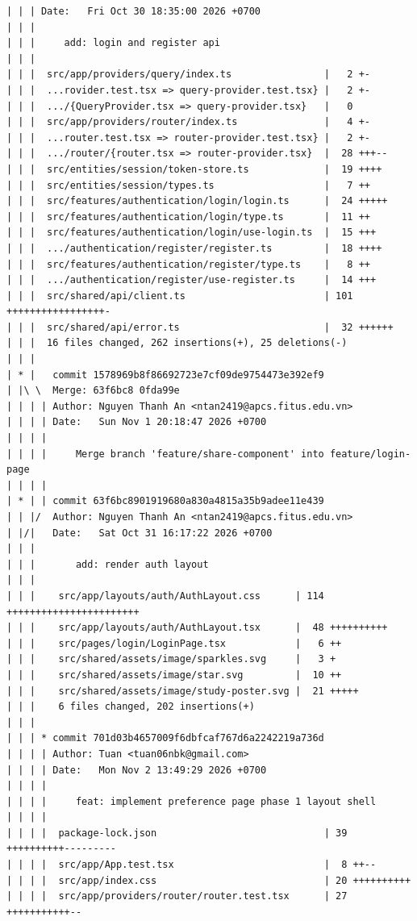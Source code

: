 \documentclass[12pt]{article}
\begin{document}
\begin{lstlisting}[numbers=none,breaklines=true]
| | | Date:   Fri Oct 30 18:35:00 2026 +0700
| | |
| | |     add: login and register api
| | |
| | |  src/app/providers/query/index.ts                |   2 +-
| | |  ...rovider.test.tsx => query-provider.test.tsx} |   2 +-
| | |  .../{QueryProvider.tsx => query-provider.tsx}   |   0
| | |  src/app/providers/router/index.ts               |   4 +-
| | |  ...router.test.tsx => router-provider.test.tsx} |   2 +-
| | |  .../router/{router.tsx => router-provider.tsx}  |  28 +++--
| | |  src/entities/session/token-store.ts             |  19 ++++
| | |  src/entities/session/types.ts                   |   7 ++
| | |  src/features/authentication/login/login.ts      |  24 +++++
| | |  src/features/authentication/login/type.ts       |  11 ++
| | |  src/features/authentication/login/use-login.ts  |  15 +++
| | |  .../authentication/register/register.ts         |  18 ++++
| | |  src/features/authentication/register/type.ts    |   8 ++
| | |  .../authentication/register/use-register.ts     |  14 +++
| | |  src/shared/api/client.ts                        | 101 +++++++++++++++++-
| | |  src/shared/api/error.ts                         |  32 ++++++
| | |  16 files changed, 262 insertions(+), 25 deletions(-)
| | |
| * |   commit 1578969b8f86692723e7cf09de9754473e392ef9
| |\ \  Merge: 63f6bc8 0fda99e
| | | | Author: Nguyen Thanh An <ntan2419@apcs.fitus.edu.vn>
| | | | Date:   Sun Nov 1 20:18:47 2026 +0700
| | | |
| | | |     Merge branch 'feature/share-component' into feature/login-page
| | | |
| * | | commit 63f6bc8901919680a830a4815a35b9adee11e439
| | |/  Author: Nguyen Thanh An <ntan2419@apcs.fitus.edu.vn>
| |/|   Date:   Sat Oct 31 16:17:22 2026 +0700
| | |
| | |       add: render auth layout
| | |
| | |    src/app/layouts/auth/AuthLayout.css      | 114 +++++++++++++++++++++++
| | |    src/app/layouts/auth/AuthLayout.tsx      |  48 ++++++++++
| | |    src/pages/login/LoginPage.tsx            |   6 ++
| | |    src/shared/assets/image/sparkles.svg     |   3 +
| | |    src/shared/assets/image/star.svg         |  10 ++
| | |    src/shared/assets/image/study-poster.svg |  21 +++++
| | |    6 files changed, 202 insertions(+)
| | |
| | | * commit 701d03b4657009f6dbfcaf767d6a2242219a736d
| | | | Author: Tuan <tuan06nbk@gmail.com>
| | | | Date:   Mon Nov 2 13:49:29 2026 +0700
| | | |
| | | |     feat: implement preference page phase 1 layout shell
| | | |
| | | |  package-lock.json                             | 39 ++++++++++---------
| | | |  src/app/App.test.tsx                          |  8 ++--
| | | |  src/app/index.css                             | 20 ++++++++++
| | | |  src/app/providers/router/router.test.tsx      | 27 +++++++++++--

\end{lstlisting}
\end{document}
